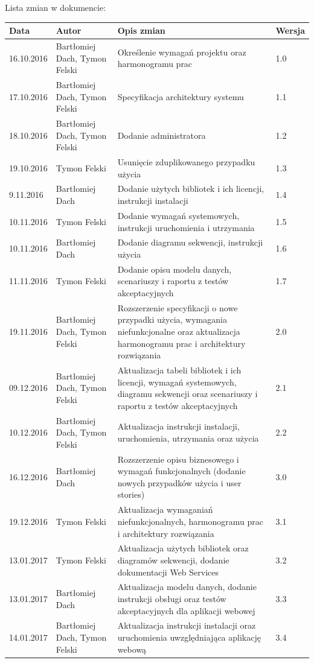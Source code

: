 \documentclass[10pt,a4paper]{article}
\begin{document}
\noindent
Lista zmian w dokumencie:
\begin{table}[H]
\def\arraystretch{1.5}
\begin{tabularx}{\textwidth}{|l|l|X|l|}
	\hline
	\textbf{Data} & \textbf{Autor} & \textbf{Opis zmian} & \textbf{Wersja} \\
	\hline
	16.10.2016 & Bartłomiej Dach, Tymon Felski & Określenie wymagań projektu oraz harmonogramu prac & 1.0 \\
	\hline
	17.10.2016 & Bartłomiej Dach, Tymon Felski & Specyfikacja architektury systemu & 1.1 \\
	\hline
	18.10.2016 & Bartłomiej Dach, Tymon Felski & Dodanie administratora & 1.2 \\
	\hline
	19.10.2016 & Tymon Felski & Usunięcie zduplikowanego przypadku użycia & 1.3 \\
	\hline
	9.11.2016 & Bartłomiej Dach & Dodanie użytych bibliotek i ich licencji, instrukcji instalacji & 1.4 \\
	\hline
	10.11.2016 & Tymon Felski & Dodanie wymagań systemowych, instrukcji uruchomienia i utrzymania & 1.5 \\
	\hline
	10.11.2016 & Bartłomiej Dach & Dodanie diagramu sekwencji, instrukcji użycia & 1.6 \\
	\hline
	11.11.2016 & Tymon Felski & Dodanie opisu modelu danych, scenariuszy i raportu z testów akceptacyjnych & 1.7 \\
	\hline
	19.11.2016 & Bartłomiej Dach, Tymon Felski & Rozszerzenie specyfikacji o nowe przypadki użycia, wymagania niefunkcjonalne oraz aktualizacja harmonogramu prac i architektury rozwiązania & 2.0 \\
	\hline
	09.12.2016 & Bartłomiej Dach, Tymon Felski & Aktualizacja tabeli bibliotek i ich licencji, wymagań systemowych, diagramu sekwencji oraz scenariuszy i raportu z testów akceptacyjnych & 2.1 \\
	\hline
	10.12.2016 & Bartłomiej Dach, Tymon Felski & Aktualizacja instrukcji instalacji, uruchomienia, utrzymania oraz użycia & 2.2 \\
	\hline
	16.12.2016 & Bartłomiej Dach & Rozszerzenie opisu biznesowego i wymagań funkcjonalnych (dodanie nowych przypadków użycia i user stories) & 3.0 \\
	\hline
	19.12.2016 & Tymon Felski & Aktualizacja wymaganiań niefunkcjonalnych, harmonogramu prac i architektury rozwiązania & 3.1 \\
	\hline
	13.01.2017 & Tymon Felski & Aktualizacja użytych bibliotek oraz diagramów sekwencji, dodanie dokumentacji Web Services & 3.2 \\
	\hline
	13.01.2017 & Bartłomiej Dach & Aktualizacja modelu danych, dodanie instrukcji obsługi oraz testów akceptacyjnych dla aplikacji webowej & 3.3 \\
	\hline
	14.01.2017 & Bartłomiej Dach, Tymon Felski & Aktualizacja instrukcji instalacji oraz uruchomienia uwzględniająca aplikację webową & 3.4 \\
	\hline
\end{tabularx}
\end{table}
\end{document}

